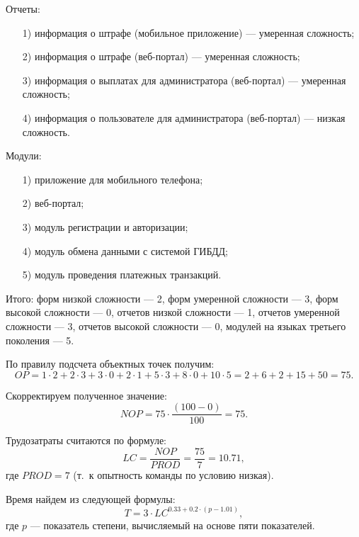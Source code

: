 \documentclass{bmstu}
\begin{document}
Отчеты:
\begin{enumerate}
\item[1)] информация о штрафе (мобильное приложение) --- умеренная сложность;
\item[2)] информация о штрафе (веб-портал) --- умеренная сложность;
\item[3)] информация о выплатах для администратора (веб-портал) --- умеренная сложность;
\item[4)] информация о пользователе для администратора (веб-портал) --- низкая сложность.
\end{enumerate}

Модули:
\begin{enumerate}
\item[1)] приложение для мобильного телефона;
\item[2)] веб-портал;
\item[3)] модуль регистрации и авторизации;
\item[4)] модуль обмена данными с системой ГИБДД;
\item[5)] модуль проведения платежных транзакций.
\end{enumerate}

Итого: форм низкой сложности --- 2, форм умеренной сложности --- 3, форм высокой сложности --- 0, отчетов низкой сложности --- 1, отчетов умеренной сложности --- 3, отчетов высокой сложности --- 0, модулей на языках третьего поколения --- 5.

По правилу подсчета объектных точек получим:
\begin{equation}
OP = 1 \cdot 2 + 2 \cdot 3 + 3 \cdot 0 + 2 \cdot 1 + 5 \cdot 3 + 8 \cdot 0 + 10 \cdot 5 = 2 + 6 + 2 + 15 + 50 = 75.
\end{equation}

Скорректируем полученное значение:
\begin{equation}
NOP = 75 \cdot \frac{(100 - 0)}{100} = 75.
\end{equation}

Трудозатраты считаются по формуле:
\begin{equation}
LC = \frac{NOP}{PROD} = \frac{75}{7} = 10.71,
\end{equation}
где $PROD = 7$ (т.~к опытность команды по условию низкая).

Время найдем из следующей формулы:
\begin{equation}
T = 3 \cdot LC^{0.33 + 0.2 \cdot (p - 1.01)},
\end{equation}
где $p$ --- показатель степени, вычисляемый на основе пяти показателей.
\end{document}
